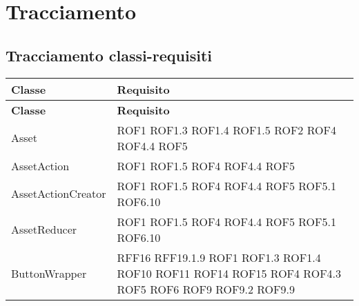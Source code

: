 \newpage
\section{Tracciamento}

\subsection{Tracciamento classi-requisiti}
\def\arraystretch{1.5}
\begin{longtable}{p{5cm}!{\VRule[1pt]}p{2.5cm}}
	\color{white} \textbf{Classe} & \color{white} \textbf{Requisito} \\ 
	\endfirsthead
	\color{white} \textbf{Classe} & \color{white} \textbf{Requisito} \\ 
	\endhead
	Asset & ROF1 \newline ROF1.3 \newline ROF1.4 \newline ROF1.5 \newline ROF2 \newline ROF4 \newline ROF4.4 \newline ROF5\\
	AssetAction & ROF1 \newline ROF1.5 \newline ROF4 \newline ROF4.4 \newline ROF5\\
	AssetActionCreator & ROF1 \newline ROF1.5 \newline ROF4 \newline ROF4.4 \newline ROF5 \newline ROF5.1 \newline ROF6.10\\
	AssetReducer & ROF1 \newline ROF1.5 \newline ROF4 \newline ROF4.4 \newline ROF5 \newline ROF5.1 \newline ROF6.10\\
	ButtonWrapper & RFF16 \newline RFF19.1.9 \newline ROF1 \newline ROF1.3 \newline ROF1.4 \newline ROF10 \newline ROF11 \newline ROF14 \newline ROF15 \newline ROF4 \newline ROF4.3 \newline ROF5 \newline ROF6 \newline ROF9 \newline ROF9.2 \newline ROF9.9\\

\end{longtable}
